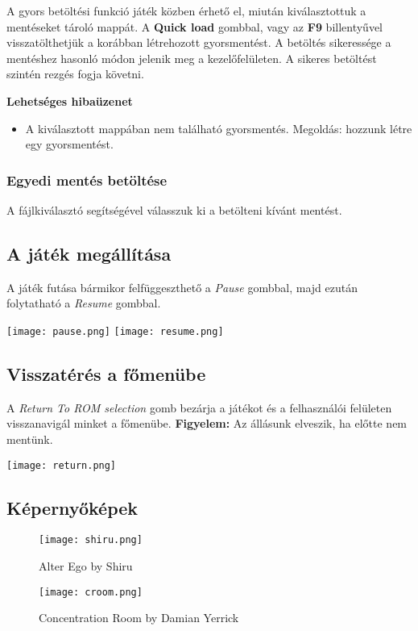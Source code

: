 A gyors betöltési funkció játék közben érhető el, miután kiválasztottuk a mentéseket tároló mappát. A \textbf{Quick load} gombbal, vagy az \textbf{F9} billentyűvel visszatölthetjük a korábban létrehozott gyorsmentést.
A betöltés sikeressége a mentéshez hasonló módon jelenik meg a kezelőfelületen.
A sikeres betöltést szintén rezgés fogja követni.

\vspace{0.2cm}
\textbf{Lehetséges hibaüzenet}
\begin{itemize}
	\item A kiválasztott mappában nem található gyorsmentés.
	Megoldás: hozzunk létre egy gyorsmentést.
\end{itemize}

\subsubsection{Egyedi mentés betöltése}

A fájlkiválasztó segítségével válasszuk ki a betölteni kívánt mentést.

\subsection{A játék megállítása}

A játék futása bármikor felfüggeszthető a \emph{Pause} gombbal, majd ezután folytatható a \emph{Resume} gombbal.

\begin{center}
	\texttt{[image: pause.png]}
	\qquad
	\texttt{[image: resume.png]}
\end{center}

\subsection{Visszatérés a főmenübe}
A \emph{Return To ROM selection} gomb bezárja a játékot és a felhasználói felületen visszanavigál minket a főmenübe.
\newline \textbf{Figyelem:} Az állásunk elveszik, ha előtte nem mentünk. 
\vspace{0.3cm}
\begin{center}
	\texttt{[image: return.png]}
\end{center}

\subsection{Képernyőképek}
\vspace{0.5cm}
\begin{figure}[H]
	\centering
	\texttt{[image: shiru.png]}
	\caption{Alter Ego by Shiru}
	\vspace{1cm}
	\texttt{[image: croom.png]}
	\caption{Concentration Room by Damian Yerrick}
\end{figure}